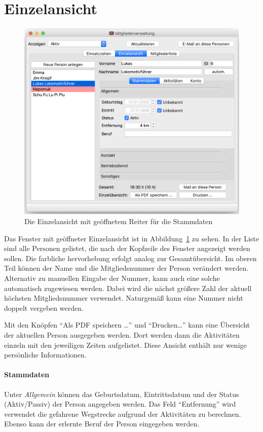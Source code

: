 \section{Einzelansicht}\label{personal:einzelansicht}
\begin{figure}[!h]
	\includegraphics[width=\textwidth]{img/einzelansicht_stammdate_allgemein}
	\caption{Die Einzelansicht mit geöffnetem Reiter für die Stammdaten}
	\label{fig:personal:einzel:stammdaten}
\end{figure}
Das Fenster mit geöffneter Einzelansicht ist in Abbildung~\ref{fig:personal:einzel:stammdaten} zu sehen.
In der Liste sind alle Personen gelistet, die nach der Kopfzeile des Fenster angezeigt werden sollen.
Die farbliche hervorhebung erfolgt analog zur Gesamtübersicht.
Im oberen Teil können der Name und die Mitgliedsnummer der Person verändert werden.
Alternativ zu manuellen Eingabe der Nummer, kann auch eine solche automatisch zugewiesen werden.
Dabei wird die nächst größere Zahl der aktuell höchsten Mitgliedsnummer verwendet.
Naturgemäß kann eine Nummer nicht doppelt vergeben werden.

Mit den Knöpfen "`Als PDF speichern \dots"' und "`Drucken\dots"' kann eine Übersicht der aktuellen Person ausgegeben werden.
Dort werden dann die Aktivitäten einzeln mit den jeweiligen Zeiten aufgelistet.
Diese Ansicht enthält nur wenige persönliche Informationen.


\paragraph{Stammdaten}
Unter \emph{Allgemein} können das Geburtsdatum, Eintrittsdatum und der Status (Aktiv/Passiv) der Person angegeben werden.
Das Feld "`Entfernung"' wird verwendet die gefahrene Wegstrecke aufgrund der Aktivitäten zu berechnen.
Ebenso kann der erlernte Beruf der Person eingegeben werden.

